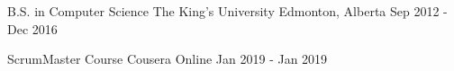 
\begin{cventries}
  \cventry
    {B.S. in Computer Science} %
    {The King's University} %
    {Edmonton, Alberta} %
    {Sep 2012 - Dec 2016} %
    {}
    
  \cventry
  	{ScrumMaster Course}
  	{Cousera}
  	{Online}
  	{Jan 2019 - Jan 2019}
  	{}
\end{cventries}
